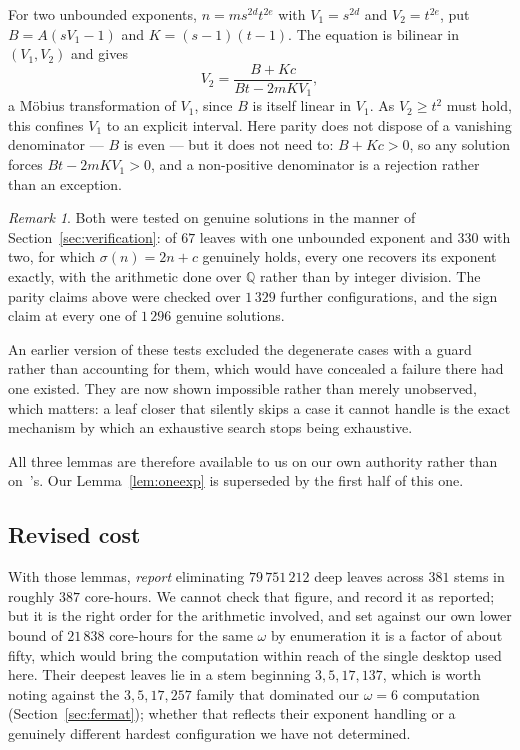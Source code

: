\documentclass[11pt]{amsart}
\theoremstyle{remark}
\newtheorem{remark}[theorem]{Remark}
\begin{document}
For two unbounded exponents, $n = m s^{2d} t^{2e}$ with $V_1 = s^{2d}$ and
$V_2 = t^{2e}$, put $B = A(sV_1 - 1)$ and $K = (s-1)(t-1)$. The equation is
bilinear in $(V_1, V_2)$ and gives
\[
  V_2 = \frac{B + Kc}{Bt - 2mK V_1} ,
\]
a M\"obius transformation of $V_1$, since $B$ is itself linear in $V_1$. As
$V_2 \ge t^{2}$ must hold, this confines $V_1$ to an explicit interval. Here parity
does not dispose of a vanishing denominator --- $B$ is even --- but it does not
need to: $B + Kc > 0$, so any solution forces $Bt - 2mKV_1 > 0$, and a
non-positive denominator is a rejection rather than an exception.

\begin{remark}
Both were tested on genuine solutions in the manner of
Section~\ref{sec:verification}: of $67$ leaves with one unbounded exponent and
$330$ with two, for which $\sigma(n) = 2n+c$ genuinely holds, every one recovers
its exponent exactly, with the arithmetic done over $\mathbb{Q}$ rather than by
integer division. The parity claims above were checked over $1\,329$ further
configurations, and the sign claim at every one of $1\,296$ genuine solutions.

An earlier version of these tests excluded the degenerate cases with a guard
rather than accounting for them, which would have concealed a failure there had
one existed. They are now shown impossible rather than merely unobserved, which
matters: a leaf closer that silently skips a case it cannot handle is the exact
mechanism by which an exhaustive search stops being exhaustive.
\end{remark}

All three lemmas are therefore available to us on our own authority rather than
on~\cite{tty}'s. Our Lemma~\ref{lem:oneexp} is superseded by the first half of
this one.

\subsection{Revised cost}
With those lemmas, \cite{tty} \emph{report} eliminating $79\,751\,212$ deep leaves
across $381$ stems in roughly $387$ core-hours. We cannot check that figure, and
record it as reported; but it is the right order for the arithmetic involved, and
set against our own lower bound of $21\,838$ core-hours for the same $\omega$ by
enumeration it is a factor of about fifty, which would bring the computation
within reach of the single desktop used here. Their deepest
leaves lie in a stem beginning $3, 5, 17, 137$, which is worth noting against the
$3, 5, 17, 257$ family that dominated our $\omega = 6$ computation
(Section~\ref{sec:fermat}); whether that reflects their exponent handling or a
genuinely different hardest configuration we have not determined.
\end{document}
